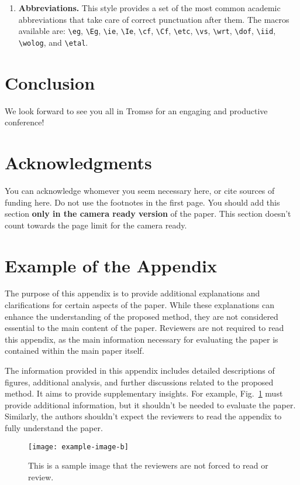 \documentclass[fullpaper]{nldl}
\begin{document}
\begin{enumerate}[leftmargin=*]
In this style, we load the \verb|biblatex| package with the \verb|biber| backend.
You must ensure the right chain of compilation: \verb|LaTeX => Biber => LaTeX| (twice).
Many modern \LaTeX\ editors can streamline this process, match your editor preferences accordingly.

\item \textbf{Abbreviations.}
This style provides a set of the most common academic abbreviations that take care of correct punctuation after them.
The macros available are: \verb|\eg|, \verb|\Eg|, \verb|\ie|, \verb|\Ie|, \verb|\cf|, \verb|\Cf|, \verb|\etc|, \verb|\vs|, \verb|\wrt|, \verb|\dof|, \verb|\iid|, \verb|\wolog|, and \verb|\etal|.

\end{enumerate}

\section{Conclusion}
We look forward to see you all in Troms{\o} for an engaging and productive conference!

\section*{Acknowledgments}

You can acknowledge whomever you seem necessary here, or cite sources of funding here.
Do not use the footnotes in the first page.
You should add this section \textbf{only in the camera ready version} of the paper.
This section doesn't count towards the page limit for the camera ready.

\printbibliography

\appendix
\section{Example of the Appendix}

The purpose of this appendix is to provide additional explanations and clarifications for certain aspects of the paper.
While these explanations can enhance the understanding of the proposed method, they are not considered essential to the main content of the paper.
Reviewers are not required to read this appendix, as the main information necessary for evaluating the paper is contained within the main paper itself.

The information provided in this appendix includes detailed descriptions of figures, additional analysis, and further discussions related to the proposed method.
It aims to provide supplementary insights.
For example, Fig.~\ref{fig:sample-app} must provide additional information, but it shouldn't be needed to evaluate the paper.
Similarly, the authors shouldn't expect the reviewers to read the appendix to fully understand the paper.

\begin{figure}[tb]
  \centering
  \texttt{[image: example-image-b]}
  \caption{This is a sample image that the reviewers are not forced to read or review.}
  \label{fig:sample-app}
\end{figure}
\end{document}
